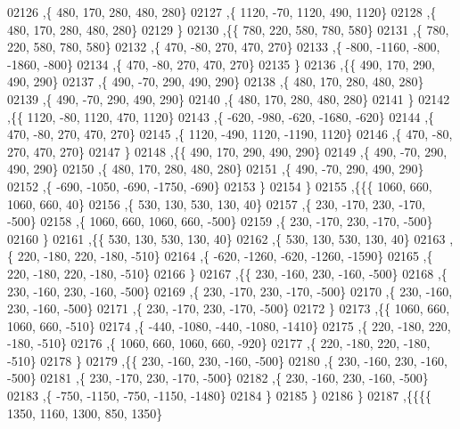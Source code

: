 \begin{DoxyCode}
02126     ,\{   480,   170,   280,   480,   280\}
02127     ,\{  1120,   -70,  1120,   490,  1120\}
02128     ,\{   480,   170,   280,   480,   280\}
02129     \}
02130    ,\{\{   780,   220,   580,   780,   580\}
02131     ,\{   780,   220,   580,   780,   580\}
02132     ,\{   470,   -80,   270,   470,   270\}
02133     ,\{  -800, -1160,  -800, -1860,  -800\}
02134     ,\{   470,   -80,   270,   470,   270\}
02135     \}
02136    ,\{\{   490,   170,   290,   490,   290\}
02137     ,\{   490,   -70,   290,   490,   290\}
02138     ,\{   480,   170,   280,   480,   280\}
02139     ,\{   490,   -70,   290,   490,   290\}
02140     ,\{   480,   170,   280,   480,   280\}
02141     \}
02142    ,\{\{  1120,   -80,  1120,   470,  1120\}
02143     ,\{  -620,  -980,  -620, -1680,  -620\}
02144     ,\{   470,   -80,   270,   470,   270\}
02145     ,\{  1120,  -490,  1120, -1190,  1120\}
02146     ,\{   470,   -80,   270,   470,   270\}
02147     \}
02148    ,\{\{   490,   170,   290,   490,   290\}
02149     ,\{   490,   -70,   290,   490,   290\}
02150     ,\{   480,   170,   280,   480,   280\}
02151     ,\{   490,   -70,   290,   490,   290\}
02152     ,\{  -690, -1050,  -690, -1750,  -690\}
02153     \}
02154    \}
02155   ,\{\{\{  1060,   660,  1060,   660,    40\}
02156     ,\{   530,   130,   530,   130,    40\}
02157     ,\{   230,  -170,   230,  -170,  -500\}
02158     ,\{  1060,   660,  1060,   660,  -500\}
02159     ,\{   230,  -170,   230,  -170,  -500\}
02160     \}
02161    ,\{\{   530,   130,   530,   130,    40\}
02162     ,\{   530,   130,   530,   130,    40\}
02163     ,\{   220,  -180,   220,  -180,  -510\}
02164     ,\{  -620, -1260,  -620, -1260, -1590\}
02165     ,\{   220,  -180,   220,  -180,  -510\}
02166     \}
02167    ,\{\{   230,  -160,   230,  -160,  -500\}
02168     ,\{   230,  -160,   230,  -160,  -500\}
02169     ,\{   230,  -170,   230,  -170,  -500\}
02170     ,\{   230,  -160,   230,  -160,  -500\}
02171     ,\{   230,  -170,   230,  -170,  -500\}
02172     \}
02173    ,\{\{  1060,   660,  1060,   660,  -510\}
02174     ,\{  -440, -1080,  -440, -1080, -1410\}
02175     ,\{   220,  -180,   220,  -180,  -510\}
02176     ,\{  1060,   660,  1060,   660,  -920\}
02177     ,\{   220,  -180,   220,  -180,  -510\}
02178     \}
02179    ,\{\{   230,  -160,   230,  -160,  -500\}
02180     ,\{   230,  -160,   230,  -160,  -500\}
02181     ,\{   230,  -170,   230,  -170,  -500\}
02182     ,\{   230,  -160,   230,  -160,  -500\}
02183     ,\{  -750, -1150,  -750, -1150, -1480\}
02184     \}
02185    \}
02186   \}
02187  ,\{\{\{\{  1350,  1160,  1300,   850,  1350\}

\end{DoxyCode}
